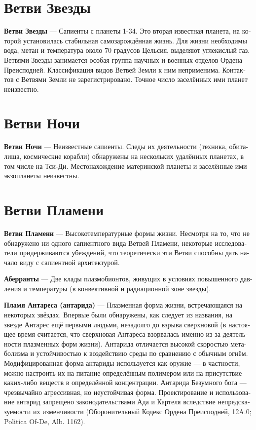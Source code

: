 \documentclass[a4paper,12pt,fleqn]{book}\usepackage{polyglossia}\setdefaultlanguage[babelshorthands=true]{russian}\setotherlanguage{english}\defaultfontfeatures{Ligatures=TeX,Mapping=tex-text}\usepackage{xcolor}\newcommand{\ml}[3]{#2}
\newcommand{\asterism}{\vspace{1em}{\centering\Large\bfseries$\ast~\ast~\ast$\par}\vspace{1em}}
\newcommand{\theterm}[3]{\textbf{\hypertarget{#1}{#2}} --- #3}
\begin{document}
\section{Ветви Звезды}

\theterm{star-forks} %
{Ветви Звезды}
{Сапиенты с планеты 1-34.
Это вторая известная планета, на которой установилась стабильная самозарождённая жизнь.
Для жизни необходимы вода, метан и температура около 70 градусов Цельсия, выделяют углекислый газ.
Ветвями Звезды занимается особая группа научных и военных отделов Ордена Преисподней.
Классификация видов Ветвей Земли к ним неприменима.
Контактов с Ветвями Земли не зарегистрировано.
Точное число заселённых ими планет неизвестно.}

\section{Ветви Ночи}

\theterm{night-forks} %
{Ветви Ночи}
{Неизвестные сапиенты.
Следы их деятельности (техника, обиталища, космические корабли) обнаружены на нескольких удалённых планетах, в том числе на Тси-Ди.
Местонахождение материнской планеты и заселённые ими экзопланеты неизвестны.}

\section{Ветви Пламени}

\theterm{flame-forks}
{Ветви Пламени}
{Высокотемпературные формы жизни.
Несмотря на то, что не обнаружено ни одного сапиентного вида Ветвей Пламени, некоторые исследователи придерживаются убеждений, что теоретически эти Ветви способны дать начало виду с сапиентной архитектурой.}

\asterism

\theterm{aberrants}
{Аберранты}
{Две клады плазмобионтов, живущих в условиях повышенного давления и температуры (в конвективной и радиационной зоне звезды).}

\theterm{flame-of-antares} %
{Пламя Антареса (антарида)}
{Плазменная форма жизни, встречающаяся на некоторых звёздах.
Впервые были обнаружены, как следует из названия, на звезде Антарес ещё первыми людьми, незадолго до взрыва сверхновой (в настоящее время считается, что сверхновая Антареса взорвалась именно из-за деятельности плазменных форм жизни).
Антарида отличается высокой скоростью метаболизма и устойчивостью к воздействию среды по сравнению с обычным огнём.
Модифицированная форма антариды используется как оружие --- в частности, можно настроить их на питание определённым полимером или на присутствие каких-либо веществ в определённой концентрации.
Антарида Безумного бога --- чрезвычайно агрессивная, но неустойчивая форма.
Проектирование и использование антарид запрещено законодательствами Ада и Картеля вследствие непредсказуемости их изменчивости (Оборонительный Кодекс Ордена Преисподней, 12A.0; Politica Of-De, Alb. 1162).}
\end{document}
